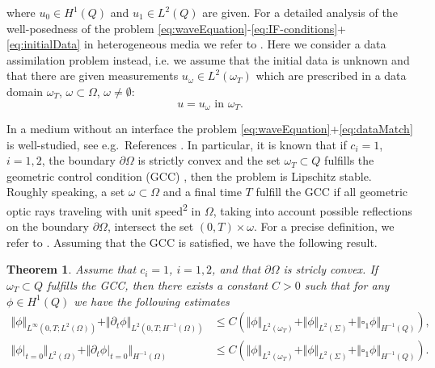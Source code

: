\documentclass[sn-mathphys-num]{sn-jnl}
\newtheorem{thm}{Theorem}[section]
\numberwithin{equation}{section}
\newcommand{\dt}{\partial_t}
\begin{document}
where $u_0 \in H^1(Q)$ and $u_1 \in L^2(Q)$ are given. For a detailed analysis of the well-posedness of the problem \eqref{eq:waveEquation}-\eqref{eq:IF-conditions}+\eqref{eq:initialData} in heterogeneous media we refer to \cite{StolkPhD}. 
Here we consider a data assimilation problem instead, i.e. we assume that the initial data is unknown and that there are given measurements $u_{\omega} \in L^2(\omega_T)$ which are prescribed in a data domain $\omega_T$, $\omega \subset \Omega$, $\omega \not = \emptyset$:
\begin{equation}\label{eq:dataMatch}
    u = u_{\omega} \text{ in } \omega_T. \tag{DA}
\end{equation}


\noindent In a medium without an interface the problem \eqref{eq:waveEquation}+\eqref{eq:dataMatch} is well-studied, see e.g.~References \cite{CM15,BFO20,BFMO21,MM21,DMS23,BDE24}. In particular, it is known that if $c_i = 1$, $i = 1,2$, the boundary $\partial \Omega$ is strictly convex and the set $\omega_T \subset Q$ fulfills the geometric control condition (GCC) \cite{BLR92}, then the problem is Lipschitz stable. Roughly speaking, a set $\omega \subset \Omega$ and a final time $T$ fulfill the GCC if all geometric optic rays traveling with unit speed\textsuperscript{2}\footnotemark {} in $\Omega$, taking into account possible reflections on the boundary $\partial \Omega$, intersect the set $(0,T) \times \omega$. For a precise definition, we refer to \cite{BLR92}. Assuming that the GCC is satisfied, we have the following result.

\begin{thm}\label{thm:Lipschitz}
    Assume that $c_i = 1$, $i = 1,2$, and that $\partial \Omega$ is stricly convex. If $\omega_T \subset Q$ fulfills the GCC, then there exists a constant $C > 0$ such that for any $\phi \in H^1(Q)$ we have the following estimates
    \begin{align*}
        \Vert \phi \Vert_{L^\infty(0,T;L^2(\Omega))} + \Vert \dt \phi \Vert_{L^2(0,T;H^{-1}(\Omega))} &\le C \left(  \Vert \phi \Vert_{L^2(\omega_T)} + \Vert \phi \Vert_{L^2(\Sigma)} + \Vert \square_1 \phi \Vert_{H^{-1}(Q)} \right), \\
        \Vert \phi \vert_{t = 0} \Vert_{L^2(\Omega)} + \Vert \dt \phi \vert_{t = 0} \Vert_{H^{-1}(\Omega)} &\le C \left(\Vert \phi \Vert_{L^2(\omega_T)} + \Vert \phi \Vert_{L^2(\Sigma)} + \Vert \square_1 \phi \Vert_{H^{-1}(Q)} \right). 
    \end{align*}
\end{thm}
\end{document}
